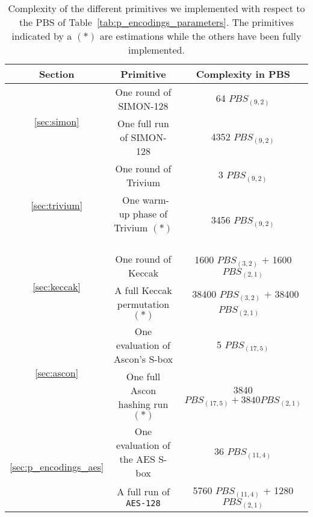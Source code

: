 \begin{table}
    \centering
    \begin{tabular}{|c|c|c|}
        \hline
        \textbf{Section} & \textbf{Primitive} & \textbf{Complexity in \gls{PBS}}  \\
        \hline
        \multirow{2}{*}{\ref{sec:simon}} & One round of SIMON-128 & 64 \texttt{$PBS_{(9, 2)}$}\\
        \cline{2-3}
        & One full run of SIMON-128 & 4352 \texttt{$PBS_{(9, 2)}$}\\
        \hline
        \multirow{2}{*}{\ref{sec:trivium}} & One round of Trivium & 3 \texttt{$PBS_{(9, 2)}$}\\
        \cline{2-3}
        & ~One warm-up phase of Trivium $(*)$~ & 3456 \texttt{$PBS_{(9, 2)}$}\\
        \hline
        \multirow{2}{*}{\ref{sec:keccak}} & One round of Keccak & 1600 \texttt{$PBS_{(3, 2)}$} $+$ 1600 \texttt{$PBS_{(2, 1)}$}\\
        \cline{2-3}
        & A full Keccak permutation $(*)$ & ~38400 \texttt{$PBS_{(3, 2)}$} $+$ 38400 \texttt{$PBS_{(2, 1)}$} ~\\
        \hline
      \multirow{2}{*}{ \ref{sec:ascon}} & One evaluation of Ascon's \gls{S-box} & 5 \texttt{$PBS_{(17, 5)}$}\\
      \cline{2-3}
      & One full Ascon hashing run $(*)$ & 3840 \texttt{$PBS_{(17, 5)} + 3840 PBS_{(2, 1)}$}\\
        \hline
        \multirow{2}{*}{\ref{sec:p_encodings_aes}} & One evaluation of the \gls{AES} \gls{S-box} & 36 \texttt{$PBS_{(11, 4)}$}\\
        \cline{2-3}
        & A full run of \texttt{\gls{AES}-128}  & 5760 \texttt{$PBS_{(11, 4)}$} + 1280 \texttt{$PBS_{(2, 1)}$}\\
        \hline
    \end{tabular}
    \medskip
    \caption{Complexity of the different primitives we implemented with respect to the \gls{PBS} of Table~\ref{tab:p_encodings_parameters}. The primitives indicated by a $(*)$ are estimations while the others have been fully implemented.}
    \label{tab:complexity_primitives}
\end{table}




